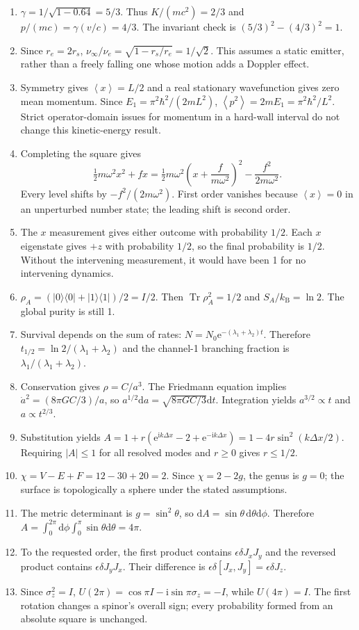 \documentclass[11pt,oneside]{book}
\newcommand{\dd}{\mathrm{d}}
\newcommand{\ii}{\mathrm{i}}
\newcommand{\ee}{\mathrm{e}}
\newcommand{\avg}[1]{\left\langle #1\right\rangle}
\newcommand{\ket}[1]{\lvert #1\rangle}
\newcommand{\bra}[1]{\langle #1\rvert}
\newcommand{\kb}{k_{\mathrm B}}
\theoremstyle{reviewstyle}
\begin{document}
\begin{enumerate}
\item $\gamma=1/\sqrt{1-0.64}=5/3$. Thus $K/(mc^2)=2/3$ and $p/(mc)=\gamma(v/c)=4/3$. The invariant check is $(5/3)^2-(4/3)^2=1$.
\item Since $r_e=2r_s$, $\nu_\infty/\nu_e=\sqrt{1-r_s/r_e}=1/\sqrt2$. This assumes a static emitter, rather than a freely falling one whose motion adds a Doppler effect.
\item Symmetry gives $\avg x=L/2$ and a real stationary wavefunction gives zero mean momentum. Since $E_1=\pi^2\hbar^2/(2mL^2)$, $\avg{p^2}=2mE_1=\pi^2\hbar^2/L^2$. Strict operator-domain issues for momentum in a hard-wall interval do not change this kinetic-energy result.
\item Completing the square gives
\[
\tfrac12m\omega^2x^2+fx=\tfrac12m\omega^2\left(x+\frac f{m\omega^2}\right)^2-\frac{f^2}{2m\omega^2}.
\]
Every level shifts by $-f^2/(2m\omega^2)$. First order vanishes because $\avg x=0$ in an unperturbed number state; the leading shift is second order.
\item The $x$ measurement gives either outcome with probability $1/2$. Each $x$ eigenstate gives $+z$ with probability $1/2$, so the final probability is $1/2$. Without the intervening measurement, it would have been 1 for no intervening dynamics.
\item $\rho_A=(\ket0\bra0+\ket1\bra1)/2=I/2$. Then $\operatorname{Tr}\rho_A^2=1/2$ and $S_A/\kb=\ln2$. The global purity is still 1.
\item Survival depends on the sum of rates: $N=N_0\ee^{-(\lambda_1+\lambda_2)t}$. Therefore $t_{1/2}=\ln2/(\lambda_1+\lambda_2)$ and the channel-1 branching fraction is $\lambda_1/(\lambda_1+\lambda_2)$.
\item Conservation gives $\rho=C/a^3$. The Friedmann equation implies $\dot a^2=(8\pi GC/3)/a$, so $a^{1/2}\dd a=\sqrt{8\pi GC/3}\dd t$. Integration yields $a^{3/2}\propto t$ and $a\propto t^{2/3}$.
\item Substitution yields $A=1+r(\ee^{\ii k\Delta x}-2+\ee^{-\ii k\Delta x})=1-4r\sin^2(k\Delta x/2)$. Requiring $|A|\leq1$ for all resolved modes and $r\geq0$ gives $r\leq1/2$.
\item $\chi=V-E+F=12-30+20=2$. Since $\chi=2-2g$, the genus is $g=0$; the surface is topologically a sphere under the stated assumptions.
\item The metric determinant is $g=\sin^2\theta$, so $\dd A=\sin\theta\,\dd\theta\dd\phi$. Therefore $A=\int_0^{2\pi}\dd\phi\int_0^\pi\sin\theta\dd\theta=4\pi$.
\item To the requested order, the first product contains $\epsilon\delta J_xJ_y$ and the reversed product contains $\epsilon\delta J_yJ_x$. Their difference is $\epsilon\delta[J_x,J_y]=\epsilon\delta J_z$.
\item Since $\sigma_z^2=I$, $U(2\pi)=\cos\pi I-\ii\sin\pi\sigma_z=-I$, while $U(4\pi)=I$. The first rotation changes a spinor's overall sign; every probability formed from an absolute square is unchanged.
\end{enumerate}
\end{document}
